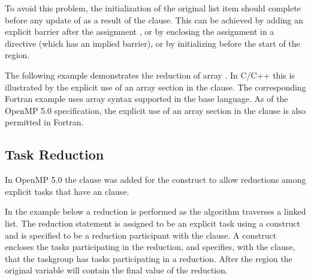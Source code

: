 To avoid this problem, the initialization of the original list item  
should complete before any update of  as a result of the  
clause. This can be achieved by adding an explicit barrier after the assignment 
, or by enclosing the assignment  in a  
directive (which has an implied barrier), or by initializing  before 
the start of the  region.



The following example demonstrates the reduction of array .  In C/C++
this is illustrated by the explicit use of an array section  in
the  clause.  The corresponding Fortran example uses array
syntax supported in the base language.  As of the OpenMP 5.0 specification, the
explicit use of an array section in the  clause is
also permitted in Fortran.




\subsection{Task Reduction}
\label{subsec:task_reduction}

In OpenMP 5.0 the  clause was added for the  construct
to allow reductions among explicit tasks that have an  clause.

In the  example below a reduction is performed as the algorithm
traverses a linked list. The reduction statement is assigned to be an explicit task using
a  construct and is specified to be a reduction participant with 
the  clause.
A  construct encloses the tasks participating in the reduction, and
specifies, with the  clause, that the taskgroup has tasks participating
in a reduction.  After the  region the original variable will contain 
the final value of the reduction.

